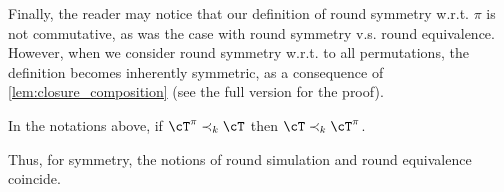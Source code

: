 Finally, the reader may notice that our definition of round symmetry w.r.t. $\pi$ is not commutative, as was the case with round symmetry v.s. round equivalence. However, when we consider round symmetry w.r.t. to all permutations, the definition becomes inherently symmetric, as a consequence of \cref{lem:closure_composition} (see the full version for the proof).
\begin{lemma}
\label{lem:round_symmetry_commutative}
    In the notations above, if $\cT^{\pi}\prec_k \cT$ then $\cT\prec_k \cT^\pi$.
\end{lemma}

Thus, for symmetry, the notions of round simulation and round equivalence coincide.

